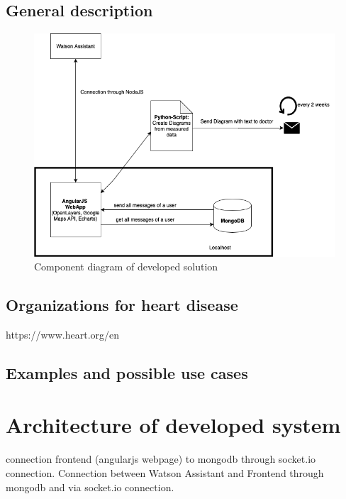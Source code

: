 \section{General description}\label{general_description}
\begin{figure}[htbp]
	\centering
	\includegraphics[width=1\textwidth]{images/components.png}
	\caption{Component diagram of developed solution}
	\label{ncbi_query}
\end{figure}

\section{Organizations for heart disease}
https://www.heart.org/en

\section{Examples and possible use cases}\label{examples}
  
              
\chapter{Architecture of developed system }\label{archtiecture}

connection frontend (angularjs webpage) to mongodb through socket.io connection.
Connection between Watson Assistant and Frontend through mongodb and via socket.io connection.



